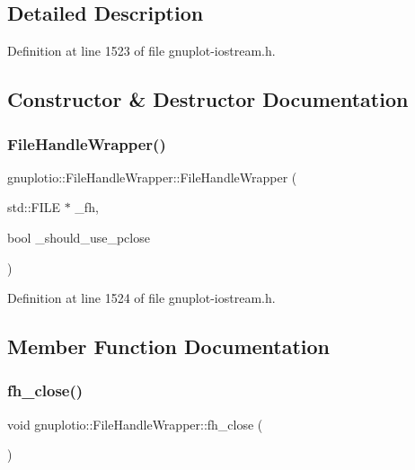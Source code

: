 \subsection{Detailed Description}


Definition at line 1523 of file gnuplot-\/iostream.\+h.



\subsection{Constructor \& Destructor Documentation}
\mbox{\label{structgnuplotio_1_1_file_handle_wrapper_a26b2378e193a9c41be5aed97e11f9411}} 
\subsubsection{\texorpdfstring{File\+Handle\+Wrapper()}{FileHandleWrapper()}}
{\footnotesize\ttfamily gnuplotio\+::\+File\+Handle\+Wrapper\+::\+File\+Handle\+Wrapper (\begin{DoxyParamCaption}\item[{std\+::\+F\+I\+LE $\ast$}]{\+\_\+fh,  }\item[{bool}]{\+\_\+should\+\_\+use\+\_\+pclose }\end{DoxyParamCaption})\hspace{0.3cm}{\ttfamily [inline]}}



Definition at line 1524 of file gnuplot-\/iostream.\+h.



\subsection{Member Function Documentation}
\mbox{\label{structgnuplotio_1_1_file_handle_wrapper_acafac45efd9c78ce621af4f3228c6f67}} 
\subsubsection{\texorpdfstring{fh\+\_\+close()}{fh\_close()}}
{\footnotesize\ttfamily void gnuplotio\+::\+File\+Handle\+Wrapper\+::fh\+\_\+close (\begin{DoxyParamCaption}{ }\end{DoxyParamCaption})\hspace{0.3cm}{\ttfamily [inline]}}



